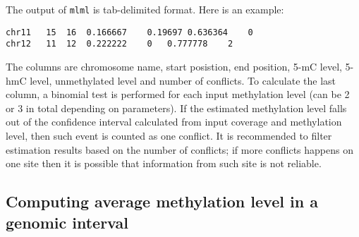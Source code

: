 \documentclass[10pt]{article}
\newcommand{\prog}[1]{\texttt{#1}}
\begin{document}
The output of \prog{mlml} is tab-delimited format. Here is an example:
\begin{verbatim}
chr11	15	16	0.166667	0.19697	0.636364	0 
chr12	11	12	0.222222	0	0.777778	2
\end{verbatim}
The columns are chromosome name, start posistion, end position, 5-mC level, 
5-hmC level, unmethylated level and number of conflicts. To calculate the last
column, a binomial test is performed for each input methylation level 
(can be 2 or 3 in total depending on parameters). If the estimated 
methylation level falls out of the confidence interval calculated from 
input coverage and methylation level, then such event is counted as one 
conflict. It is recommended to filter estimation results based on the number 
of conflicts; if more conflicts happens on one site then it is possible 
that information from such site is not reliable.

\subsection{Computing average methylation level in a genomic interval}
\label{sec:roimethstat}
\end{document}
